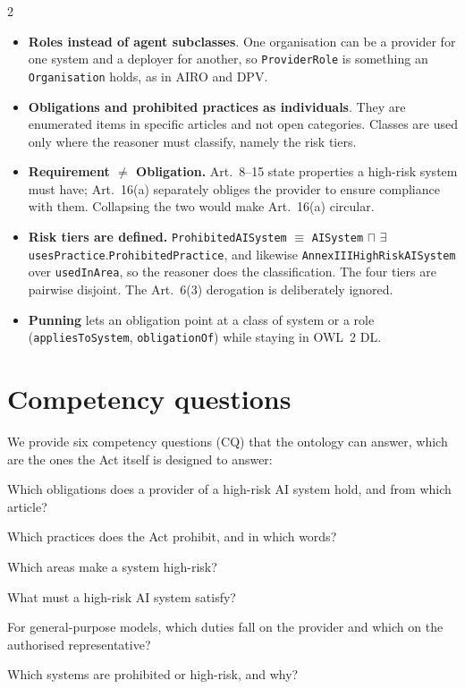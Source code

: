 \documentclass[10pt,a4paper]{article}
\begin{document}
\begin{multicols}{2}
\begin{itemize}
  \item \textbf{Roles instead of agent subclasses}. One organisation can be a provider for one
        system and a deployer for another, so \texttt{ProviderRole} is something an
        \texttt{Organisation} holds, as in AIRO and DPV.
  \item \textbf{Obligations and prohibited practices as individuals}. They are enumerated
        items in specific articles and not open categories. Classes are used only where the reasoner
        must classify, namely the risk tiers.
  \item \textbf{Requirement $\neq$ Obligation.} Art.~8--15 state properties a high-risk system must
        have; Art.~16(a) separately obliges the provider to ensure compliance with them. Collapsing
        the two would make Art.~16(a) circular.
  \item \textbf{Risk tiers are defined.} \texttt{ProhibitedAISystem} $\equiv$
        \texttt{AISystem} $\sqcap$ $\exists$\texttt{uses\-Practice}.\allowbreak\texttt{Prohibited\-Practice},
        and likewise \texttt{AnnexIII\-HighRisk\-AISystem} over \texttt{usedInArea}, so the reasoner does the
        classification. The four tiers are pairwise disjoint. The Art.~6(3) derogation is
        deliberately ignored.
  \item \textbf{Punning} lets an obligation point at a class of system or a role
        (\texttt{appliesToSystem}, \texttt{obligationOf}) while staying in OWL~2 DL.
\end{itemize}

\section{Competency questions}

We provide six competency questions (CQ) that the ontology can answer, which are the ones the Act itself is designed to answer:
\begin{enumerate*}[label=\textbf{CQ\arabic*},itemjoin={{; }},itemjoin*={{; and }}]
  \item Which obligations does a provider of a high-risk AI system hold, and from which article?
  \item Which practices does the Act prohibit, and in which words?
  \item Which areas make a system high-risk?
  \item What must a high-risk AI system satisfy?
  \item For general-purpose models, which duties fall on the provider and which on the authorised
        representative?
  \item Which systems are prohibited or high-risk, and why?
\end{enumerate*}


\end{multicols}
\end{document}
